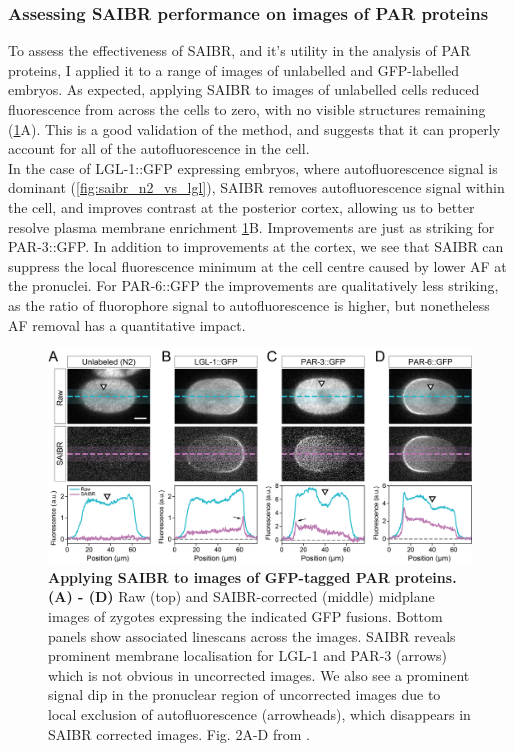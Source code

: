 \documentclass[12pt]{"article"}
\newcommand{\mycaption}[2]{\caption[#1]{\textbf{#1.} #2}}
\begin{document}
\subsubsection{Assessing SAIBR performance on images of PAR proteins}

To assess the effectiveness of SAIBR, and it’s utility in the analysis of PAR proteins, I applied it to a range of images of unlabelled and GFP-labelled embryos. As expected, applying SAIBR to images of unlabelled cells reduced fluorescence from across the cells to zero, with no visible structures remaining (\cref{fig:saibr_spatial_correction}A). This is a good validation of the method, and suggests that it can properly account for all of the autofluorescence in the cell. \\

In the case of LGL-1::GFP expressing embryos, where autofluorescence signal is dominant (\cref{fig:saibr_n2_vs_lgl}), SAIBR removes autofluorescence signal within the cell, and improves contrast at the posterior cortex, allowing us to better resolve plasma membrane enrichment \cref{fig:saibr_spatial_correction}B. Improvements are just as striking for PAR-3::GFP. In addition to improvements at the cortex, we see that SAIBR can suppress the local fluorescence minimum at the cell centre caused by lower AF at the pronuclei. For PAR-6::GFP the improvements are qualitatively less striking, as the ratio of fluorophore signal to autofluorescence is higher, but nonetheless AF removal has a quantitative impact.\\

\begin{figure}
\includegraphics[scale=0.9]{saibr_spatial_correction}
\centering
\mycaption{Applying SAIBR to images of GFP-tagged PAR proteins}{
\textbf{(A) - (D)} Raw (top) and SAIBR-corrected (middle) midplane images of zygotes expressing the indicated GFP fusions. Bottom panels show associated linescans across the images. SAIBR reveals prominent membrane localisation for LGL-1 and PAR-3 (arrows) which is not obvious in uncorrected images. We also see a prominent signal dip in the pronuclear region of uncorrected images due to local exclusion of autofluorescence (arrowheads), which disappears in SAIBR corrected images.
Fig. 2A-D from \textcite{Rodrigues2022}.}
\label{fig:saibr_spatial_correction}
\end{figure}
\end{document}
